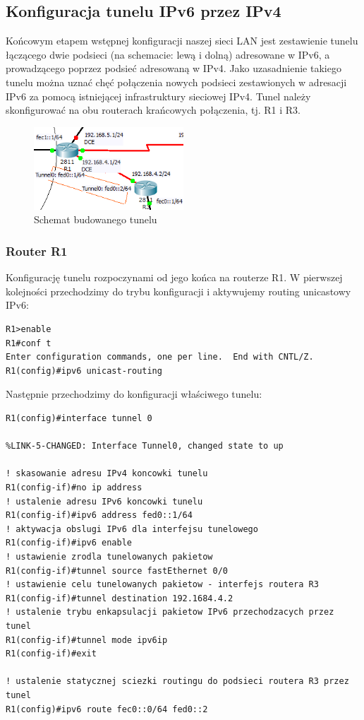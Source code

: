 \documentclass[polish,11pt,a4paper,twoside]{article}
\begin{document}
\subsection{Konfiguracja tunelu IPv6 przez IPv4}
Końcowym etapem wstępnej konfiguracji naszej sieci LAN jest zestawienie tunelu łączącego dwie podsieci (na schemacie: lewą i dolną) adresowane w IPv6, a prowadzącego poprzez podsieć adresowaną w IPv4. Jako uzasadnienie takiego tunelu można uznać chęć połączenia nowych podsieci zestawionych w adresacji IPv6 za pomocą istniejącej infrastruktury sieciowej IPv4.
Tunel należy skonfigurować na obu routerach krańcowych połączenia, tj. R1 i R3.
\begin{figure}[!htb]
\begin{center}
    \includegraphics[width=0.5\textwidth]{tunel.png}
    \caption{Schemat budowanego tunelu} \label{fig:tunel} 
\end{center}
\end{figure}

\subsubsection{Router R1}
Konfigurację tunelu rozpoczynami od jego końca na routerze R1. W pierwszej kolejności przechodzimy do trybu konfiguracji i aktywujemy routing unicastowy IPv6:
\begin{lstlisting}
R1>enable
R1#conf t
Enter configuration commands, one per line.  End with CNTL/Z.
R1(config)#ipv6 unicast-routing 
\end{lstlisting}
Następnie przechodzimy do konfiguracji właściwego tunelu:
\begin{lstlisting}
R1(config)#interface tunnel 0

%LINK-5-CHANGED: Interface Tunnel0, changed state to up

! skasowanie adresu IPv4 koncowki tunelu
R1(config-if)#no ip address 
! ustalenie adresu IPv6 koncowki tunelu
R1(config-if)#ipv6 address fed0::1/64
! aktywacja obslugi IPv6 dla interfejsu tunelowego
R1(config-if)#ipv6 enable
! ustawienie zrodla tunelowanych pakietow
R1(config-if)#tunnel source fastEthernet 0/0
! ustawienie celu tunelowanych pakietow - interfejs routera R3
R1(config-if)#tunnel destination 192.1684.4.2
! ustalenie trybu enkapsulacji pakietow IPv6 przechodzacych przez tunel
R1(config-if)#tunnel mode ipv6ip
R1(config-if)#exit

! ustalenie statycznej sciezki routingu do podsieci routera R3 przez tunel
R1(config)#ipv6 route fec0::0/64 fed0::2
\end{lstlisting}
\end{document}
